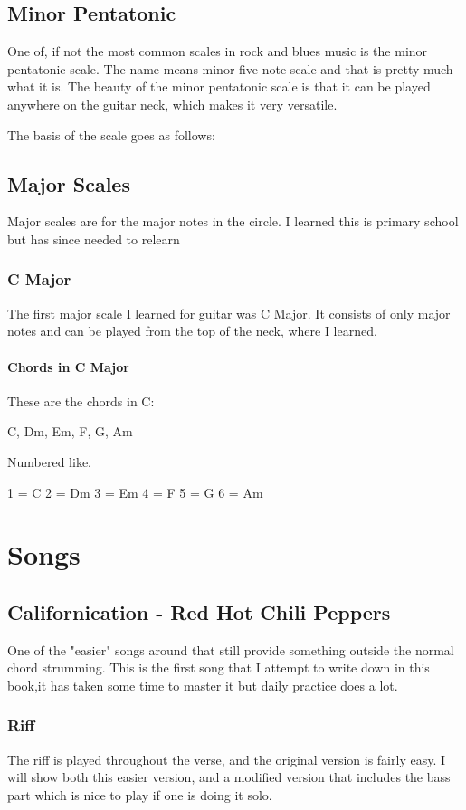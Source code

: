 \documentclass[11pt]{book}
\begin{document}
    \section{Minor Pentatonic}
    One of, if not the most common scales in rock and blues music is the minor pentatonic scale.
    The name means minor five note scale and that is pretty much what it is.
    The beauty of the minor pentatonic scale is that it can be played anywhere on the guitar neck, which makes it very versatile.

    The basis of the scale goes as follows:

    \bigskip

    \scales[
    name = Minor Pentatonic,
    finger = {
    2/1:1, 5/1:4,
    2/2:1, 5/2:4,
    2/3:1, 4/3:3,
    2/4:1, 4/4:3,
    2/5:1, 4/5:3,
    2/6:1, 5/6:4
    },
    root = {2/6, 4/4, 2/1}
    ]


    \section{Major Scales}
    Major scales are for the major notes in the circle.
    I learned this is primary school but has since needed to relearn

    \subsection{C Major}
    The first major scale I learned for guitar was C Major.
    It consists of only major notes and can be played from the top of the neck, where I learned.

    \scales[
    name = C Major
    position = 1,
    finger = {
    1/1:1,3/1:3,
    1/2:1,3/2:3,
    2/3:2,
    2/4:2,3/4:3,
    2/5:2,3/5:3,
    1/6:2,3/6:3
    }
    ]

    \subsubsection{Chords in C Major}
    These are the chords in C:

    C, Dm, Em, F, G, Am

    Numbered like.

    1 = C
    2 = Dm
    3 = Em
    4 = F
    5 = G
    6 = Am


    \chapter{Songs}


    \section{Californication - Red Hot Chili Peppers}
    One of the "easier" songs around that still provide something outside the normal chord strumming.
    This is the first song that I attempt to write down in this book,it has taken some time to master it but daily practice does a lot.

    \subsection{Riff}
    The riff is played throughout the verse, and the original version is fairly easy.
    I will show both this easier version, and a modified version that includes the bass part which is nice to play if one is doing it solo.
\end{document}
